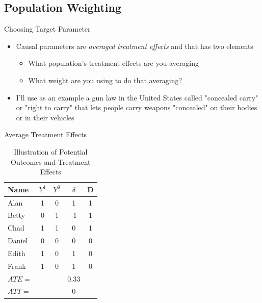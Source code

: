 \documentclass{beamer}
\begin{document}
\subsection{Population Weighting}



\begin{frame}{Choosing Target Parameter}

\begin{itemize}
\item Causal parameters are \emph{averaged treatment effects} and that has two elements
	\begin{itemize}
	\item What population's treatment effects are you averaging
	\item What weight are you using to do that averaging?
	\end{itemize}
\item I'll use as an example a gun law in the United States called "concealed carry" or "right to carry" that lets people carry weapons "concealed" on their bodies or in their vehicles
\end{itemize}

\end{frame}


\begin{frame}{Average Treatment Effects}

\begin{table}[htbp]\centering
\caption{Illustration of Potential Outcomes and Treatment Effects}\label{tab:step1_table}
\begin{tabular}{lccc|c}
\toprule
\textbf{Name} & \textbf{$Y^1$} & \textbf{$Y^0$} & \textbf{$\delta$} & \textbf{D}  \\
\midrule
Alan    & 1 & 0 & 1  & 1  \\
Betty   & 0 & 1 & -1 & 1  \\
Chad    & 1 & 1 & 0  & 1  \\
Daniel  & 0 & 0 & 0  & 0  \\
Edith   & 1 & 0 & 1  & 0  \\
Frank   & 1 & 0 & 1  & 0  \\
\midrule
$ATE =$&&& 0.33 \\
$ATT =$&&&0 \\
\bottomrule
\end{tabular}
\end{table}

\end{frame}
\end{document}
